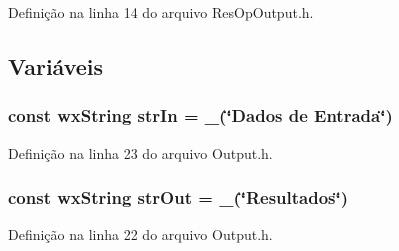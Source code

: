 Definição na linha 14 do arquivo Res\+Op\+Output.\+h.



\subsection{Variáveis}
\subsubsection[{str\+In}]{\setlength{\rightskip}{0pt plus 5cm}const wx\+String str\+In = \+\_\+(\char`\"{}Dados de Entrada\char`\"{})}\label{group___resultados_ga371824451af1b573359f9e648c6f17ff}


Definição na linha 23 do arquivo Output.\+h.

\subsubsection[{str\+Out}]{\setlength{\rightskip}{0pt plus 5cm}const wx\+String str\+Out = \+\_\+(\char`\"{}Resultados\char`\"{})}\label{group___resultados_ga04b44e92884a01907cdedb310ee5a4e8}


Definição na linha 22 do arquivo Output.\+h.

